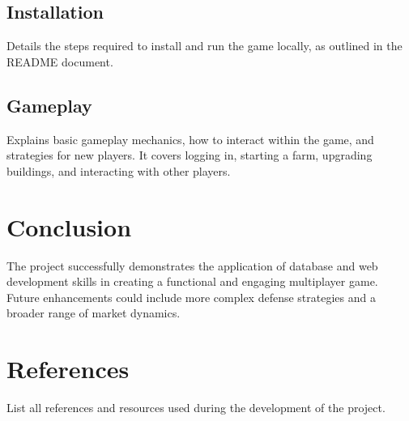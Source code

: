 \documentclass[12pt]{article}
\begin{document}
\subsection{Installation}
Details the steps required to install and run the game locally, as outlined in the README document.

\subsection{Gameplay}
Explains basic gameplay mechanics, how to interact within the game, and strategies for new players. It covers logging in, starting a farm, upgrading buildings, and interacting with other players.

\section{Conclusion}
The project successfully demonstrates the application of database and web development skills in creating a functional and engaging multiplayer game. Future enhancements could include more complex defense strategies and a broader range of market dynamics.

\section{References}
List all references and resources used during the development of the project.
\end{document}
